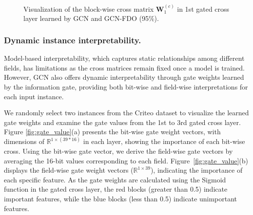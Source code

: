 \documentclass[sigconf]{acmart}
\begin{document}
\begin{figure}[tb]
\setlength{\abovecaptionskip}{0.2cm}
\setlength{\belowcaptionskip}{-0.2cm}
\centering
{}

\centering
\caption{Visualization of the block-wise cross matrix $\mathbf{W}_1^{(c)}$ in 1st gated cross layer learned by GCN and GCN-FDO (95\%). } 
\label{fig:heatmap_cross}
\end{figure}

\subsubsection{Dynamic instance interpretability.}

Model-based interpretability, which captures static relationships among different fields, has limitations as the cross matrices remain fixed once a model is trained. However, GCN also offers dynamic interpretability through gate weights learned by the information gate, providing both bit-wise and field-wise interpretations for each input instance.

We randomly select two instances from the Criteo dataset to visualize the learned gate weights and examine the gate values from the 1st to 3rd gated cross layer. Figure \ref{fig:gate_value}(a) presents the bit-wise gate weight vectors, with dimensions of $\mathbb{R}^{1\times(39*16)}$ in each layer, showing the importance of each bit-wise cross. Using the bit-wise gate vector, we derive the field-wise gate vectors by averaging the 16-bit values corresponding to each field. Figure~\ref{fig:gate_value}(b) displays the field-wise gate weight vectors ($\mathbb{R}^{1\times39}$), indicating the importance of each specific feature. As the gate weights are calculated using the Sigmoid function in the gated cross layer, the red blocks (greater than 0.5) indicate important features, while the blue blocks (less than 0.5) indicate unimportant features.
\end{document}
